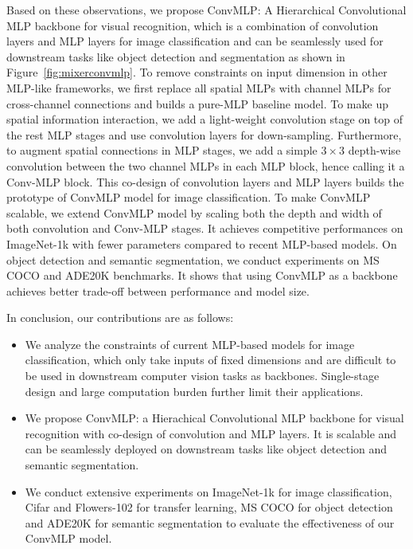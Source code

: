 \documentclass[final]{cvpr}
\begin{document}
Based on these observations, we propose ConvMLP: A Hierarchical Convolutional MLP backbone for visual recognition, which is a combination of convolution layers and MLP layers for image classification and can be seamlessly used for downstream tasks like object detection and segmentation as shown in Figure~\ref{fig:mixerconvmlp}. To remove constraints on input dimension in other MLP-like frameworks, we first replace all spatial MLPs with channel MLPs for cross-channel connections and builds a pure-MLP baseline model. To make up spatial information interaction, we add a light-weight convolution stage on top of the rest MLP stages and use convolution layers for down-sampling. Furthermore, to augment spatial connections in MLP stages, we add a simple $3\times3$ depth-wise convolution between the two channel MLPs in each MLP block, hence calling it a Conv-MLP block. This co-design of convolution layers and MLP layers builds the prototype of ConvMLP model for image classification. To make ConvMLP scalable, we extend ConvMLP model by scaling both the depth and width of both convolution and Conv-MLP stages. It achieves competitive performances on ImageNet-1k with fewer parameters compared to recent MLP-based models. On object detection and semantic segmentation, we conduct experiments on MS COCO and ADE20K benchmarks. It shows that using ConvMLP as a backbone achieves better trade-off between performance and model size.

In conclusion, our contributions are as follows:
\begin{itemize}
\item We analyze the constraints of current MLP-based models for image classification, which only take inputs of fixed dimensions and are difficult to be used in downstream computer vision tasks as backbones. Single-stage design and large computation burden further limit their applications.

\item We propose ConvMLP: a Hierachical Convolutional MLP backbone for visual recognition with co-design of convolution and MLP layers. It is scalable and can be seamlessly deployed on downstream tasks like object detection and semantic segmentation. 

\item We conduct extensive experiments on ImageNet-1k for image classification, Cifar and Flowers-102 for transfer learning, MS COCO for object detection and ADE20K for semantic segmentation to evaluate the effectiveness of our ConvMLP model.

\end{itemize}
\end{document}
